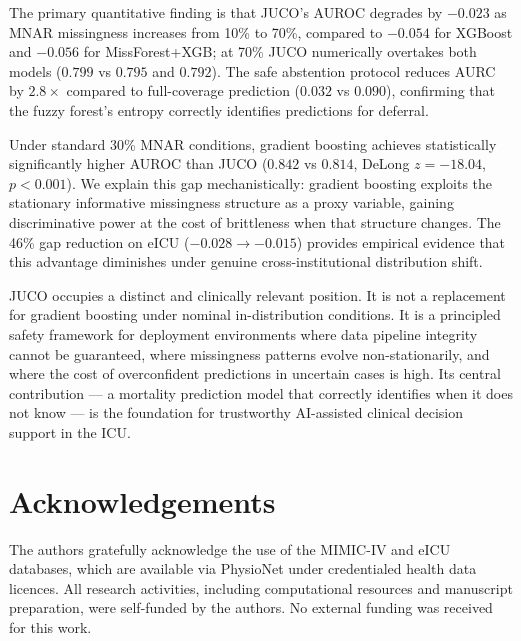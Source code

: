 \documentclass[a4paper,fleqn,longmktitle]{cas-sc}
\begin{document}
	The primary quantitative finding is that JUCO's AUROC degrades
	by $-0.023$ as MNAR missingness increases from 10\% to 70\%,
	compared to $-0.054$ for XGBoost and $-0.056$ for MissForest+XGB;
	at 70\% JUCO numerically overtakes both models ($0.799$ vs $0.795$
	and $0.792$).
	The safe abstention protocol reduces AURC by $2.8{\times}$ compared
	to full-coverage prediction ($0.032$ vs $0.090$), confirming that
	the fuzzy forest's entropy correctly identifies predictions for
	deferral.
	
	Under standard 30\% MNAR conditions, gradient boosting achieves
	statistically significantly higher AUROC than JUCO
	($0.842$ vs $0.814$, DeLong $z = -18.04$, $p < 0.001$).
	We explain this gap mechanistically: gradient boosting exploits
	the stationary informative missingness structure as a proxy variable,
	gaining discriminative power at the cost of brittleness when
	that structure changes.
	The 46\% gap reduction on eICU ($-0.028 \to -0.015$) provides
	empirical evidence that this advantage diminishes under genuine
	cross-institutional distribution shift.
	
	JUCO occupies a distinct and clinically relevant position.
	It is not a replacement for gradient boosting under nominal
	in-distribution conditions.
	It is a principled safety framework for deployment environments
	where data pipeline integrity cannot be guaranteed, where
	missingness patterns evolve non-stationarily, and where the cost
	of overconfident predictions in uncertain cases is high.
	Its central contribution — a mortality prediction model that
	correctly identifies when it does not know — is the foundation
	for trustworthy AI-assisted clinical decision support in the ICU.
	

	
	\section*{Acknowledgements}
	

	The authors gratefully acknowledge the use of the MIMIC-IV and eICU databases, which are available via PhysioNet under credentialed health data licences. All research activities, including computational resources and manuscript preparation, were self-funded by the authors. No external funding was received for this work.
	
	
	
\end{document}
